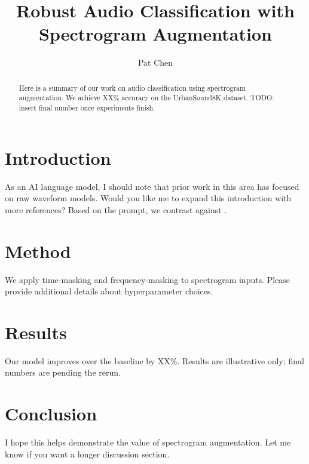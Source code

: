 \documentclass{article}
\title{Robust Audio Classification with Spectrogram Augmentation}
\author{Pat Chen}
\begin{document}
\maketitle

\begin{abstract}
Here is a summary of our work on audio classification using spectrogram
augmentation. We achieve XX\% accuracy on the UrbanSound8K dataset.
TODO: insert final number once experiments finish.
\end{abstract}

\section{Introduction}
As an AI language model, I should note that prior work in this area has focused
on raw waveform models. Would you like me to expand this introduction with more
references? Based on the prompt, we contrast against \cite{salamon2015urbansound}.

\section{Method}
We apply time-masking and frequency-masking to spectrogram inputs. Please
provide additional details about hyperparameter choices.

\section{Results}
Our model improves over the baseline by XX\%. Results are illustrative only;
final numbers are pending the rerun.

\section{Conclusion}
I hope this helps demonstrate the value of spectrogram augmentation. Let me
know if you want a longer discussion section.


\end{document}
